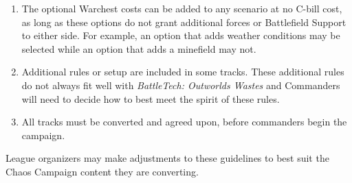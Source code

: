 \begin{enumerate}
\item The optional Warchest costs can be added to any scenario at no C-bill cost, as long as these options do not grant additional forces or Battlefield Support to either side.
For example, an option that adds weather conditions may be selected while an option that adds a minefield may not.

\item Additional rules or setup are included in some tracks.
These additional rules do not always fit well with \emph{BattleTech: Outworlds Wastes} and Commanders will need to decide how to best meet the spirit of these rules.

\item All tracks must be converted and agreed upon, before commanders begin the campaign.

\end{enumerate}

League organizers may make adjustments to these guidelines to best suit the Chaos Campaign content they are converting.
